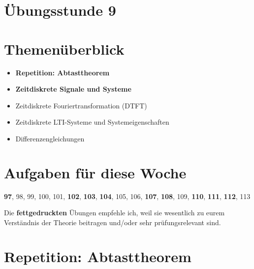 \documentclass[11pt]{article}
\begin{document}
\thispagestyle{firstpage}

\setlength{\headheight}{1 \baselineskip}  %
\setlength{\parindent}{0pt}  %
\setlength{\parskip}{\baselineskip}  %

\vspace*{-5px}
\section*{Übungsstunde 9}

\section*{Themenüberblick}
\begin{itemize}
    \item \textbf{Repetition: Abtasttheorem}
    \item \textbf{Zeitdiskrete Signale und Systeme}
    \item[] Zeitdiskrete Fouriertransformation (DTFT)
    \item[] Zeitdiskrete LTI-Systeme und Systemeigenschaften
    \item[] Differenzengleichungen
\end{itemize}

\section*{Aufgaben für diese Woche}
\vspace{-0.5cm}

\textbf{97}, 98, 99, 100, 101, \textbf{102}, \textbf{103}, \textbf{104}, 105, 106, \textbf{107}, \textbf{108}, 109, \textbf{110}, \textbf{111}, \textbf{112}, 113\\
\vspace{-0.5cm}

Die \textbf{fettgedruckten} Übungen empfehle ich, weil sie wesentlich zu eurem Verständnis der Theorie beitragen und/oder sehr prüfungsrelevant sind.

\vfill \null
\pagebreak

\section*{Repetition: Abtasttheorem}
\vspace*{-0.5cm}
\end{document}
